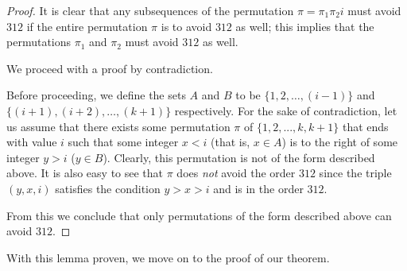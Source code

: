 \documentclass[11pt,letterpaper,twoside,english]{article}
\theoremstyle{theorem}
\theoremstyle{remark}
\begin{document}
\begin{proof}
It is clear that any subsequences of the permutation $\pi = \pi_1 \pi_2 i$ must avoid $312$ if the entire permutation $\pi$ is to avoid $312$ as well; this implies that the permutations $\pi_1$ and $\pi_2$ must avoid $312$ as well.

We proceed with a proof by contradiction.

Before proceeding, we define the sets $A$ and $B$ to be $\{1,2,\ldots,(i-1)\}$ and $\{(i+1),(i+2),\ldots,(k+1)\}$ respectively. For the sake of contradiction, let us assume that there exists some permutation $\pi$ of $\{1,2,...,k,k+1\}$ that ends with value $i$ such that some integer $x < i$ (that is, $x \in A$) is to the right of some integer $y > i$ ($y \in B$). Clearly, this permutation is not of the form described above. It is also easy to see that $\pi$ does \emph{not} avoid the order $312$ since the triple $(y, x, i)$ satisfies the condition $y > x > i$ and is in the order $312$.

From this we conclude that only permutations of the form described above can avoid $312$.

\end{proof}

With this lemma proven, we move on to the proof of our theorem.
\end{document}
